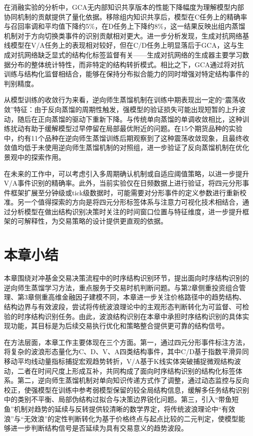 在消融实验的分析中，GCA无内部知识共享版本的性能下降幅度为理解模型内部协同机制的贡献提供了量化依据。移除组内知识共享后，模型在C任务上的精确率与召回率调和平均值下降约5\%，在D任务上下降约8\%，这一结果反映出组内蒸馏机制对于方向切换类事件的识别贡献相对更大。进一步分析发现，生成对抗网络基线模型在V/A任务上的表现相对较好，但在C/D任务上明显落后于GCA，这与生成对抗网络缺乏显式的结构化标签监督有关——生成对抗网络的生成器主要学习数据分布的整体统计特性，而非特定的结构转折模式。相比之下，GCA通过将对抗训练与结构化监督相结合，能够在保持分布拟合能力的同时增强对特定结构事件的判别精度。

从模型训练的收敛行为来看，逆向师生蒸馏机制在训练中期表现出一定的``震荡收敛''特征：由于反向蒸馏的周期性触发，强模型的验证损失可能出现短暂的上升波动，随后在正向蒸馏的驱动下重新下降。与传统单向蒸馏的单调收敛相比，这种训练扰动有助于缓解模型过早停留在局部最优附近的问题。在15个期货品种的实验中，约有11个品种在逆向师生蒸馏训练后期观察到了这种震荡收敛现象，且最终收敛值均低于未使用逆向师生蒸馏机制的对照组，进一步验证了反向蒸馏机制在优化景观中的探索作用。

在未来的工作中，可以考虑引入多周期确认机制或自适应阈值策略，以进一步提升V/A事件识别的精确率。此外，当前实验仅在日频数据上进行验证，将四元分形事件框架扩展至分钟级或tick级数据时，可能需要对分形事件的定义参数进行重新校准。另一个值得探索的方向是将四元分形标签体系与注意力可视化技术相结合，通过分析模型在做出结构识别决策时关注的时间窗口位置与特征维度，进一步提升框架的可解释性，为交易策略的设计提供更直观的依据。


\section{本章小结}

本章围绕对冲基金交易决策流程中的时序结构识别环节，提出面向时序结构识别的逆向师生蒸馏学习方法，重点服务于交易时机判断问题。与第2章侧重投资组合管理、第3章侧重高维金融因子建模不同，本章进一步关注价格路径中的趋势结构、结构边界与有效波段，尝试将传统波浪理论中的主观形态判断转化为可监督、可检验的时序结构识别任务。由此，波浪结构识别在本章中承担时序结构识别的具体实现功能，其目标是为后续交易执行优化和策略整合提供更可靠的结构信号。

在方法层面，本章工作主要体现在三个方面。第一，通过四元分形事件标注方法，将复杂的波浪形态量化为C、D、V、A四类结构事件，其中C/D基于指数平滑异同移动平均线动量指标捕捉宏观趋势转折，V/A基于K线实体突破捕捉微观结构波动，二者在时间尺度上形成互补，共同构成了面向时序结构识别的结构化标签体系。第二，逆向师生蒸馏机制对单向知识传递方式作了调整，通过动态监控与反向校正，使强模型在训练中参考弱模型保留的较全局结构信息，缓解多任务结构识别中的类别不平衡、局部伪结构过拟合与决策边界锐化问题。第三，引入``带鱼短鱼''机制对趋势的延续与反转提供较清晰的数学界定，将传统波浪理论中``有效浪''与``无效浪''的定性判断转化为基于价格终点与起点比较的二元判定，使模型能够进一步判断结构信号是否延续为具有交易意义的趋势波段。

